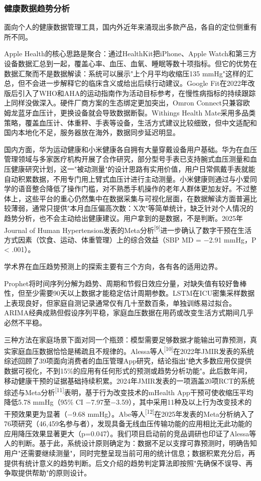 \documentclass[zihao=-4,a4paper]{ctexart}
\numberwithin{figure}{section}
\numberwithin{table}{section}
\begin{document}
\subsubsection{健康数据趋势分析}

面向个人的健康数据管理工具，国内外近年来涌现出多款产品，各自的定位侧重有所不同。

Apple Health的核心思路是聚合：通过HealthKit把iPhone、Apple Watch和第三方设备数据汇总到一起，覆盖心率、血压、血氧、睡眠等数十项指标。但它的优势在数据汇聚而不是数据解读：系统可以展示"上个月平均收缩压135 mmHg"这样的汇总，但不会进一步解释它的临床含义或给出后续行动建议。Google Fit在2022年改版后引入了WHO和AHA的运动指南作为活动目标参考，在慢性病指标的持续跟踪上同样没做深入。硬件厂商方案的生态绑定更加突出，Omron Connect只兼容欧姆龙蓝牙血压计，更换设备就会导致数据断裂。Withings Health Mate采用多品类策略，覆盖血压计、体重秤、手表等设备，生活方式建议比较细致，但中文适配和国内本地化不足，服务器放在海外，数据同步延迟明显。

国内方面，华为运动健康和小米健康各自拥有大量穿戴设备用户基础。华为在血压管理领域与多家医疗机构开展了合作研究，部分型号手表已支持腕式血压测量和血压健康研究计划，这一"被动测量"的设计思路有实用价值，用户日常佩戴手表就能自动积累数据，不用专门用上臂式血压计进行主动测量。小米健康则通过与小爱同学的语音整合降低了操作门槛，对不熟悉手机操作的老年人群体更加友好。不过整体上，这些平台的重心仍然集中在数据采集与可视化层面，在数据解读方面普遍比较薄弱，通常只提供"本月血压偏高次数：X次"等简单统计，缺乏针对个人情况的趋势分析，也不会主动给出健康建议。用户拿到的是数据，不是判断。2025年Journal of Human Hypertension发表的Meta分析\textsuperscript{[9]}进一步确认了数字干预在生活方式因素（饮食、运动、体重管理）上的综合效益（SBP MD = $-$2.91 mmHg，P < .001）。

学术界在血压趋势预测上的探索主要有三个方向，各有各的适用边界。

Prophet将时间序列分解为趋势、周期和节假日效应分量，对缺失值有较好鲁棒性，但至少需要90天以上数据才能稳定估计周期参数。LSTM在ICU密集采样数据上表现良好，但家庭自测记录通常仅有几十至数百条，单独训练易过拟合。ARIMA经典成熟但假设序列平稳，家庭血压数据在用药或改变生活方式期间几乎必然不平稳。

三种方法在家庭场景下面对同一个瓶颈：模型需要足够数据才能输出可靠预测，真实家庭血压数据恰恰是稀疏且不规律的。Alessa等人\textsuperscript{[10]}在2022年JMIR发表的系统综述回顾了39项面向消费者的血压管理App研究，结论指出"绝大多数应用仅提供数据可视化，不到15\%的应用有任何形式的预测或趋势分析功能"。此后数年间，移动健康干预的证据基础持续积累。2024年JMIR发表的一项涵盖20项RCT的系统综述与Meta分析\textsuperscript{[11]}表明，基于行为改变技术的mHealth App干预可使收缩压平均降低5.78 mmHg（95\% CI $-$7.97至$-$3.59），其中采用11种及以上行为改变技术的干预效果更为显著（$-$9.68 mmHg）。Abe等人\textsuperscript{[12]}在2025年发表的Meta分析纳入了76项研究（46,459名参与者），发现具备无线血压传输功能的应用相比无此功能的应用降压效果显著更大（p=0.047）。我们项目启动前的竞品调研也印证了Alessa等人的判断。基于此，系统设计原则确定为：数据不足以支撑可靠预测时，明确告知用户"还需要继续测量"，同时完整呈现当前可用的统计信息；数据积累充分后，再提供有统计意义的趋势判断。后文介绍的趋势判定算法即按照"先确保不误导、再争取提供帮助"的原则设计。
\end{document}
